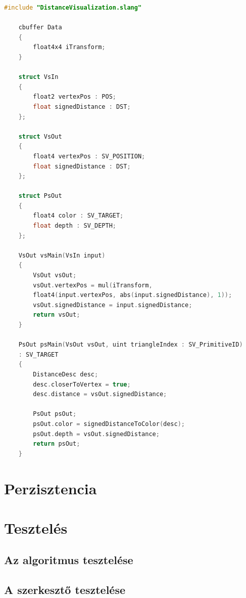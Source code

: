 \begin{lstlisting}[language=c]
	#include "DistanceVisualization.slang"

	cbuffer Data
	{
		float4x4 iTransform;
	}

	struct VsIn
	{
		float2 vertexPos : POS;
		float signedDistance : DST;
	};

	struct VsOut
	{
		float4 vertexPos : SV_POSITION;
		float signedDistance : DST;
	};

	struct PsOut
	{
		float4 color : SV_TARGET;
		float depth : SV_DEPTH;
	};

	VsOut vsMain(VsIn input)
	{
		VsOut vsOut;
		vsOut.vertexPos = mul(iTransform,
		float4(input.vertexPos, abs(input.signedDistance), 1));
		vsOut.signedDistance = input.signedDistance;
		return vsOut;
	}

	PsOut psMain(VsOut vsOut, uint triangleIndex : SV_PrimitiveID)
	: SV_TARGET
	{
		DistanceDesc desc;
		desc.closerToVertex = true;
		desc.distance = vsOut.signedDistance;

		PsOut psOut;
		psOut.color = signedDistanceToColor(desc);
		psOut.depth = vsOut.signedDistance;
		return psOut;
	}
\end{lstlisting}



\section{Perzisztencia}

\section{Tesztelés}

\subsection{Az algoritmus tesztelése}

\subsection{A szerkesztő tesztelése}
